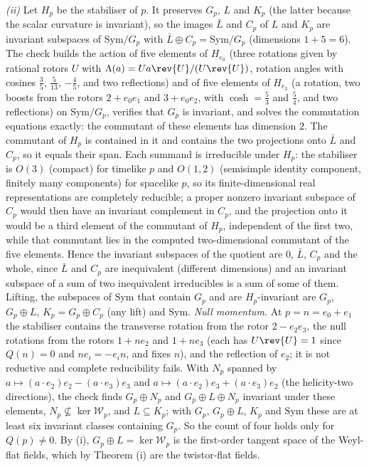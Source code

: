 \emph{(ii)} Let $H_{p}$ be the stabiliser of $p$. It preserves $G_{p}$, $L$ and $K_{p}$ (the latter because the scalar curvature is invariant), so the images $\bar L$ and $C_{p}$ of $L$ and $K_{p}$ are invariant subspaces of $\mathrm{Sym}/G_{p}$ with $\bar L \oplus C_{p} = \mathrm{Sym}/G_{p}$ (dimensions $1 + 5 = 6$). The check builds the action of five elements of $H_{e_{0}}$ (three rotations given by rational rotors $U$ with $\Lambda(a) = U a \rev{U}/(U\rev{U})$, rotation angles with cosines $\tfrac35$, $\tfrac{5}{13}$, $-\tfrac45$, and two reflections) and of five elements of $H_{e_{3}}$ (a rotation, two boosts from the rotors $2 + e_{0}e_{1}$ and $3 + e_{0}e_{2}$, with $\cosh = \tfrac53$ and $\tfrac54$, and two reflections) on $\mathrm{Sym}/G_{p}$, verifies that $G_{p}$ is invariant, and solves the commutation equations exactly: the commutant of these elements has dimension $2$. The commutant of $H_{p}$ is contained in it and contains the two projections onto $\bar L$ and $C_{p}$, so it equals their span. Each summand is irreducible under $H_{p}$: the stabiliser is $O(3)$ (compact) for timelike $p$ and $O(1,2)$ (semisimple identity component, finitely many components) for spacelike $p$, so its finite-dimensional real representations are completely reducible; a proper nonzero invariant subspace of $C_{p}$ would then have an invariant complement in $C_{p}$, and the projection onto it would be a third element of the commutant of $H_{p}$, independent of the first two, while that commutant lies in the computed two-dimensional commutant of the five elements. Hence the invariant subspaces of the quotient are $0$, $\bar L$, $C_{p}$ and the whole, since $\bar L$ and $C_{p}$ are inequivalent (different dimensions) and an invariant subspace of a sum of two inequivalent irreducibles is a sum of some of them. Lifting, the subspaces of $\mathrm{Sym}$ that contain $G_{p}$ and are $H_{p}$-invariant are $G_{p}$, $G_{p} \oplus L$, $K_{p} = G_{p} \oplus C_{p}$ (any lift) and $\mathrm{Sym}$. \emph{Null momentum.} At $p = n = e_{0} + e_{1}$ the stabiliser contains the transverse rotation from the rotor $2 - e_{2}e_{3}$, the null rotations from the rotors $1 + n e_{2}$ and $1 + n e_{3}$ (each has $U\rev{U} = 1$ since $Q(n) = 0$ and $n e_{i} = -e_{i}n$, and fixes $n$), and the reflection of $e_{2}$; it is not reductive and complete reducibility fails. With $N_{p}$ spanned by $a \mapsto (a \cdot e_{2})e_{2} - (a \cdot e_{3})e_{3}$ and $a \mapsto (a \cdot e_{2})e_{3} + (a \cdot e_{3})e_{2}$ (the helicity-two directions), the check finds $G_{p} \oplus N_{p}$ and $G_{p} \oplus L \oplus N_{p}$ invariant under these elements, $N_{p} \not\subseteq \ker\mathcal{W}_{p}$, and $L \subseteq K_{p}$; with $G_{p}$, $G_{p} \oplus L$, $K_{p}$ and $\mathrm{Sym}$ these are at least six invariant classes containing $G_{p}$. So the count of four holds only for $Q(p) \neq 0$. By (i), $G_{p} \oplus L = \ker\mathcal{W}_{p}$ is the first-order tangent space of the Weyl-flat fields, which by Theorem (i) are the twistor-flat fields.

